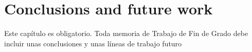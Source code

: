 \chapter{Conclusions and future work}
\label{cap:6-conclusions}

Este capítulo es obligatorio.
Toda memoria de Trabajo de Fin de Grado debe incluir unas conclusiones y unas 
líneas de trabajo futuro 

